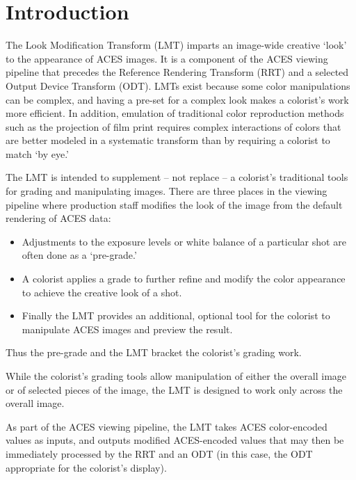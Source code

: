\unnumberedformat	    %
\chapter{Introduction} 	%

The Look Modification Transform (LMT) imparts an image-wide creative `look' to the appearance of ACES images. It is a component of the ACES viewing pipeline that precedes the Reference Rendering Transform (RRT) and a selected Output Device Transform (ODT). LMTs exist because some color manipulations can be complex, and having a pre-set for a complex look makes a colorist's work more efficient. In addition, emulation of traditional color reproduction methods such as the projection of film print requires complex interactions of colors that are better modeled in a systematic transform than by requiring a colorist to match `by eye.'

The LMT is intended to supplement -- not replace -- a colorist's traditional tools for grading and manipulating images. There are three places in the viewing pipeline where production staff modifies the look of the image from the default rendering of ACES data:  

\begin{itemize}
    \item   Adjustments to the exposure levels or white balance of a particular shot are often done as a `pre-grade.'
    \item   A colorist applies a grade to further refine and modify the color appearance to achieve the creative look of a shot. 
    \item   Finally the LMT provides an additional, optional tool for the colorist to manipulate ACES images and preview the result.
\end{itemize}

Thus the pre-grade and the LMT bracket the colorist's grading work.

While the colorist's grading tools allow manipulation of either the overall image or of selected pieces of the image, the LMT is designed to work only across the overall image. 

As part of the ACES viewing pipeline, the LMT takes ACES color-encoded values as inputs, and outputs modified ACES-encoded values that may then be immediately processed by the RRT and an ODT (in this case, the ODT appropriate for the colorist’s display).

